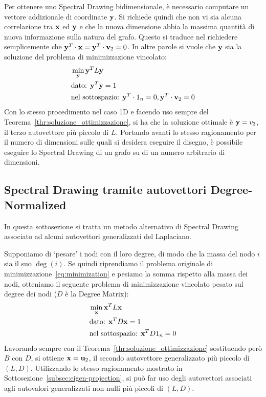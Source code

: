 \documentclass[10pt,a4paper]{article}
\begin{document}
Per ottenere uno Spectral Drawing bidimensionale, è necessario computare un vettore addizionale di coordinate \(\vb{y}\).
Si richiede quindi che non vi sia alcuna correlazione tra \(\vb{x}\) ed \(\vb{y}\) e che la nuova dimensione abbia la massima quantità di nuova informazione sulla natura del grafo.
Questo si traduce nel richiedere semplicemente che \(\vb{y}^T \cdot \vb{x} = \vb{y}^T \cdot \vb{v}_2 = 0\). In altre parole si vuole che \(\vb{y}\) sia la soluzione del problema di minimizzazione vincolato:
\begin{align}
    & \min_{\vb{y}} \vb{y}^T L\vb{y}\\
    & \text{dato: } \vb{y}^T\vb{y} = 1 \\
    & \text{nel sottospazio: } \vb{y}^T \cdot 1_n = 0, \vb{y}^T \cdot \vb{v}_2 = 0
\end{align}
Con lo stesso procedimento nel caso 1D e facendo uso sempre del Teorema~\ref{thr:soluzione_ottimizzazione}, si ha che la soluzione ottimale è \(\vb{y}=v_3\), il terzo autovettore più piccolo di \(L\).
Portando avanti lo stesso ragionamento per il numero di dimensioni sulle quali si desidera eseguire il disegno, è possibile eseguire lo Spectral Drawing di un grafo su di un numero arbitrario di dimensioni.

\subsection{Spectral Drawing tramite autovettori Degree-Normalized}\label{subsec:alt_spectral}

In questa sottosezione si tratta un metodo alternativo di Spectral Drawing associato ad alcuni autovettori generalizzati del Laplaciano.

Supponiamo di `pesare' i nodi con il loro degree, di modo che la massa del nodo \(i\) sia il suo \(\deg(i)\).
Se quindi riprendiamo il problema originale di minimizzazione~\eqref{eq:minimization} e pesiamo la somma rispetto alla massa dei nodi, otteniamo il seguente problema di minimizzazione vincolato pesato sul degree dei nodi (\(D\) è la Degree Matrix):
\begin{align}
    & \min_{\vb{x}} \vb{x}^T L \vb{x} \label{eq:with_degree}\\
    & \text{dato: } \vb{x}^T D \vb{x} = 1\\
    & \text{nel sottospazio: } \vb{x}^T D 1_n = 0
\end{align}
Lavorando sempre con il Teorema~\ref{thr:soluzione_ottimizzazione} sostituendo però \(B\) con \(D\), si ottiene \(\vb{x} = \vb{u}_2\), il secondo autovettore generalizzato più piccolo di \((L, D)\).
Utilizzando lo stesso ragionamento mostrato in Sottosezione~\ref{subsec:eigen-projection}, si può far uso degli autovettori associati agli autovalori generalizzati non nulli più piccoli di \((L, D)\).
\end{document}
